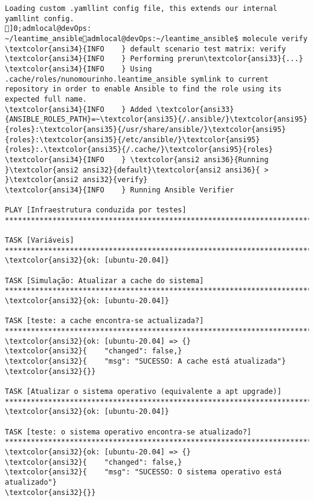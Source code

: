 \documentclass{scrartcl}
\begin{document}
\begin{Verbatim}
Loading custom .yamllint config file, this extends our internal yamllint config.
]0;admlocal@devOps: ~/leantime_ansibleadmlocal@devOps:~/leantime_ansible$ molecule verify
\textcolor{ansi34}{INFO    } default scenario test matrix: verify
\textcolor{ansi34}{INFO    } Performing prerun\textcolor{ansi33}{...}
\textcolor{ansi34}{INFO    } Using .cache/roles/nunomourinho.leantime_ansible symlink to current repository in order to enable Ansible to find the role using its expected full name.
\textcolor{ansi34}{INFO    } Added \textcolor{ansi33}{ANSIBLE_ROLES_PATH}=~\textcolor{ansi35}{/.ansible/}\textcolor{ansi95}{roles}:\textcolor{ansi35}{/usr/share/ansible/}\textcolor{ansi95}{roles}:\textcolor{ansi35}{/etc/ansible/}\textcolor{ansi95}{roles}:.\textcolor{ansi35}{/.cache/}\textcolor{ansi95}{roles}
\textcolor{ansi34}{INFO    } \textcolor{ansi2 ansi36}{Running }\textcolor{ansi2 ansi32}{default}\textcolor{ansi2 ansi36}{ > }\textcolor{ansi2 ansi32}{verify}
\textcolor{ansi34}{INFO    } Running Ansible Verifier

PLAY [Infraestrutura conduzida por testes] ***********************************************************************************************

TASK [Variáveis] *************************************************************************************************************************
\textcolor{ansi32}{ok: [ubuntu-20.04]}

TASK [Simulação: Atualizar a cache do sistema] *******************************************************************************************
\textcolor{ansi32}{ok: [ubuntu-20.04]}

TASK [teste: a cache encontra-se actualizada?] *******************************************************************************************
\textcolor{ansi32}{ok: [ubuntu-20.04] => {}
\textcolor{ansi32}{    "changed": false,}
\textcolor{ansi32}{    "msg": "SUCESSO: A cache está atualizada"}
\textcolor{ansi32}{}}

TASK [Atualizar o sistema operativo (equivalente a apt upgrade)] *************************************************************************
\textcolor{ansi32}{ok: [ubuntu-20.04]}

TASK [teste: o sistema operativo encontra-se atualizado?] ********************************************************************************
\textcolor{ansi32}{ok: [ubuntu-20.04] => {}
\textcolor{ansi32}{    "changed": false,}
\textcolor{ansi32}{    "msg": "SUCESSO: O sistema operativo está atualizado"}
\textcolor{ansi32}{}}


\end{Verbatim}
\end{document}
